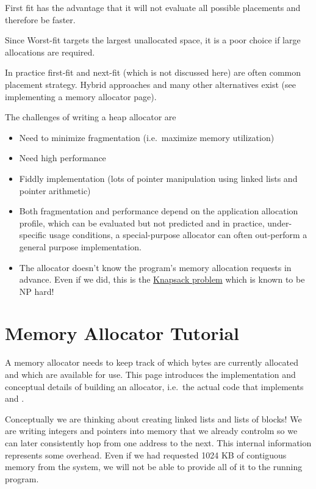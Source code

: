 First fit has the advantage that it will not evaluate all possible placements and therefore be faster.

Since Worst-fit targets the largest unallocated space, it is a poor choice if large allocations are required.

In practice first-fit and next-fit (which is not discussed here) are often common placement strategy. Hybrid approaches and many other alternatives exist (see implementing a memory allocator page).

The challenges of writing a heap allocator are 
\begin{itemize}
\item Need to minimize fragmentation (i.e.~maximize memory utilization) 
\item Need high performance 
\item Fiddly implementation (lots of pointer manipulation using linked lists and pointer arithmetic)
\item Both fragmentation and performance depend on the application allocation profile, which can be evaluated but not predicted and in practice, under-specific usage conditions, a special-purpose allocator can often out-perform a general purpose implementation. 
\item The allocator doesn't know the program's memory allocation requests in advance. Even if we did, this is the \href{http://en.wikipedia.org/wiki/Knapsack_problem}{Knapsack problem} which is known to be NP hard!
\end{itemize}


\section{Memory Allocator Tutorial}

A memory allocator needs to keep track of which bytes are currently allocated and which are available for use. This page introduces the implementation and conceptual details of building an allocator, i.e.~the actual code that implements  and .

Conceptually we are thinking about creating linked lists and lists of blocks! We are writing integers and pointers into memory that we already controlm so we can later consistently hop from one address to the next. This internal information represents some overhead. Even if we had requested 1024 KB of contiguous memory from the system, we will not be able to provide all of it to the running program.

